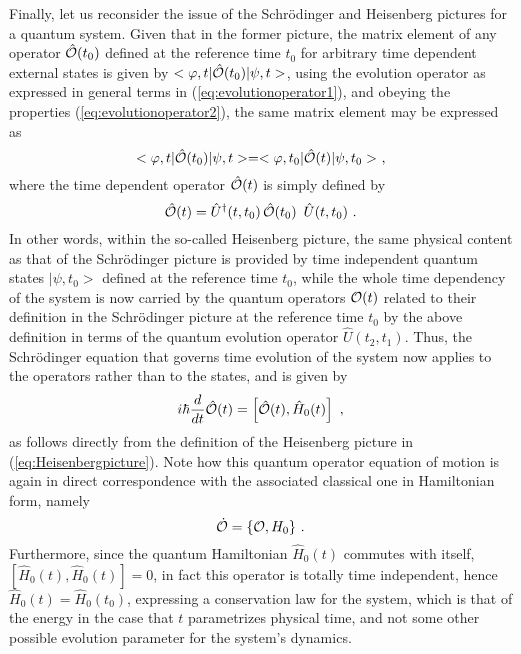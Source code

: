 \documentclass[a4paper,11pt]{article}
\begin{document}
Finally, let us reconsider the issue of the Schr\"odinger and Heisenberg
pictures for a quantum system. Given that in the former picture, the
matrix element of any operator $\hat{\cal O}(t_0)$ defined at the
reference time $t_0$ for arbitrary time dependent external states is
given by $<\varphi,t|\hat{\cal O}(t_0)|\psi,t>$,
using the evolution operator as expressed in general terms in
(\ref{eq:evolutionoperator1}), and obeying the properties 
(\ref{eq:evolutionoperator2}), the same matrix element may be expressed as
\begin{equation}
<\varphi,t|\hat{\cal O}(t_0)|\psi,t>=<\varphi,t_0|\hat{\cal O}(t)|\psi,t_0>\ ,
\end{equation}
where the time dependent operator $\hat{\cal O}(t)$ is simply defined by
\begin{equation}
\hat{\cal O}(t)=\hat{U}^\dagger(t,t_0)\,\hat{\cal O}(t_0)\,\
\hat{U}(t,t_0)\ .
\label{eq:Heisenbergpicture}
\end{equation}
In other words, within the so-called Heisenberg picture, the same physical
content as that of the Schr\"odinger picture is provided by time independent
quantum states $|\psi,t_0>$ defined at the reference time $t_0$, while
the whole time dependency of the system is now carried by the quantum
operators ${\cal O}(t)$ related to their definition in the Schr\"odinger
picture at the reference time $t_0$ by the above definition in terms
of the quantum evolution operator $\hat{U}(t_2,t_1)$. Thus, the Schr\"odinger
equation that governs time evolution of the system now applies to the
operators rather than to the states, and is given by 
\begin{equation}
i\hbar\frac{d}{dt}\hat{\cal O}(t)=\left[\hat{\cal O}(t),\hat{H}_0(t)\right]\ ,
\end{equation}
as follows directly from the definition of the Heisenberg
picture in (\ref{eq:Heisenbergpicture}). Note how this quantum operator 
equation of motion is again in direct correspondence with the associated
classical one in Hamiltonian form, namely
\begin{equation}
\dot{\cal O}=\{{\cal O},H_0\}\ .
\end{equation}
Furthermore, since the quantum Hamiltonian $\hat{H}_0(t)$ commutes
with itself, $[\hat{H}_0(t),\hat{H}_0(t)]=0$, in fact this operator
is totally time independent, hence $\hat{H}_0(t)=\hat{H}_0(t_0)$, expressing
a conservation law for the system, which is that of the energy
in the case that $t$ parametrizes physical time, and not some other
possible evolution parameter for the system's dynamics.
\end{document}
